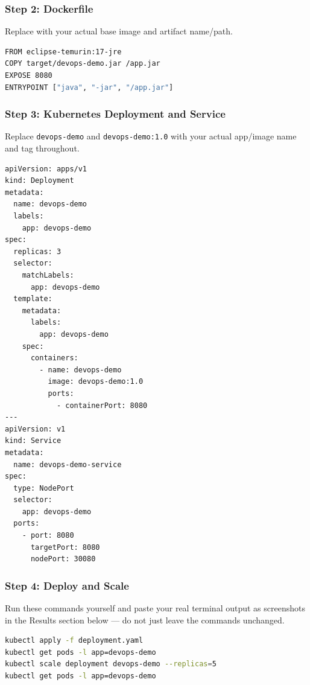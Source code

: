 \documentclass[12pt,a4paper]{article}
\begin{document}
\subsubsection*{Step 2: Dockerfile}
\begin{studentnote}
Replace with your actual base image and artifact name/path.
\end{studentnote}
\begin{lstlisting}[language=bash]
FROM eclipse-temurin:17-jre
COPY target/devops-demo.jar /app.jar
EXPOSE 8080
ENTRYPOINT ["java", "-jar", "/app.jar"]
\end{lstlisting}

\subsubsection*{Step 3: Kubernetes Deployment and Service}
\begin{studentnote}
Replace \texttt{devops-demo} and \texttt{devops-demo:1.0} with your actual app/image name and tag throughout.
\end{studentnote}
\begin{lstlisting}[language=bash]
apiVersion: apps/v1
kind: Deployment
metadata:
  name: devops-demo
  labels:
    app: devops-demo
spec:
  replicas: 3
  selector:
    matchLabels:
      app: devops-demo
  template:
    metadata:
      labels:
        app: devops-demo
    spec:
      containers:
        - name: devops-demo
          image: devops-demo:1.0
          ports:
            - containerPort: 8080
---
apiVersion: v1
kind: Service
metadata:
  name: devops-demo-service
spec:
  type: NodePort
  selector:
    app: devops-demo
  ports:
    - port: 8080
      targetPort: 8080
      nodePort: 30080
\end{lstlisting}

\subsubsection*{Step 4: Deploy and Scale}
\begin{studentnote}
Run these commands yourself and paste your real terminal output as screenshots in the Results section below --- do not just leave the commands unchanged.
\end{studentnote}
\begin{lstlisting}[language=bash]
kubectl apply -f deployment.yaml
kubectl get pods -l app=devops-demo
kubectl scale deployment devops-demo --replicas=5
kubectl get pods -l app=devops-demo
\end{lstlisting}
\end{document}
